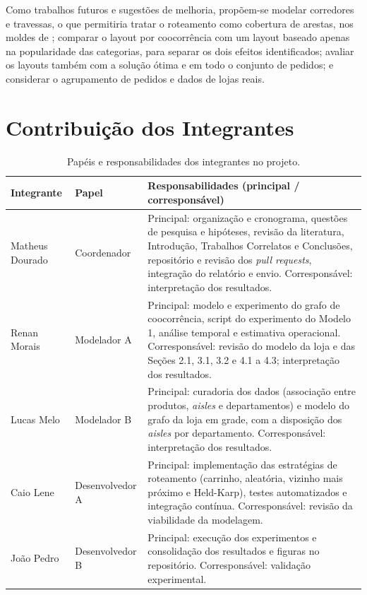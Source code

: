 Como trabalhos futuros e sugestões de melhoria, propõem-se modelar corredores e travessas, o que permitiria tratar o roteamento como cobertura de arestas, nos moldes de \citet{ratliff1983}; comparar o layout por coocorrência com um layout baseado apenas na popularidade das categorias, para separar os dois efeitos identificados; avaliar os layouts também com a solução ótima e em todo o conjunto de pedidos; e considerar o agrupamento de pedidos e dados de lojas reais.

\section*{Contribuição dos Integrantes}

\begin{table}[!ht]
\caption{Papéis e responsabilidades dos integrantes no projeto.}
\label{tab:papeis}
\centering
\footnotesize
\begin{tabular}{@{}p{}p{}p{}@{}}
\hline
\textbf{Integrante} & \textbf{Papel} & \textbf{Responsabilidades (principal / corresponsável)} \\ \hline
Matheus Dourado & Coordenador & Principal: organização e cronograma, questões de pesquisa e hipóteses, revisão da literatura, Introdução, Trabalhos Correlatos e Conclusões, repositório e revisão dos \textit{pull requests}, integração do relatório e envio. Corresponsável: interpretação dos resultados. \\
Renan Morais & Modelador A & Principal: modelo e experimento do grafo de coocorrência, script do experimento do Modelo 1, análise temporal e estimativa operacional. Corresponsável: revisão do modelo da loja e das Seções 2.1, 3.1, 3.2 e 4.1 a 4.3; interpretação dos resultados. \\
Lucas Melo & Modelador B & Principal: curadoria dos dados (associação entre produtos, \textit{aisles} e departamentos) e modelo do grafo da loja em grade, com a disposição dos \textit{aisles} por departamento. Corresponsável: interpretação dos resultados. \\
Caio Lene & Desenvolvedor A & Principal: implementação das estratégias de roteamento (carrinho, aleatória, vizinho mais próximo e Held-Karp), testes automatizados e integração contínua. Corresponsável: revisão da viabilidade da modelagem. \\
João Pedro & Desenvolvedor B & Principal: execução dos experimentos e consolidação dos resultados e figuras no repositório. Corresponsável: validação experimental. \\ \hline
\end{tabular}
\end{table}
